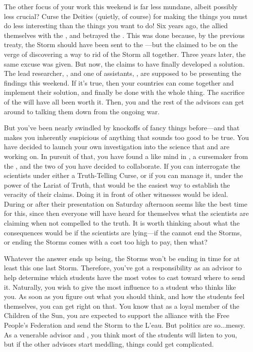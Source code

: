 \documentclass[char]{GL2020}
\begin{document}
The other focus of your work this weekend is far less mundane, albeit possibly less crucial? Curse the Deities (quietly, of course) for making the things you must do less interesting than the things you want to do! Six years ago, the \pFarm{} allied themselves with the \pTech{}, and betrayed the \pShip{}. This was done because, by the previous treaty, the Storm should have been sent to the \pTech{}---but the \pTech{} claimed to be on the verge of discovering a way to rid \pEarth{} of the Storm all together. Three years later, the same excuse was given. But now, the \pTech{} claims to have finally developed a solution. The lead researcher, \cHeadScientist{\full}, and one of \cHeadScientist{\their} assistants, \cAssistantScientist{\full}, are supposed to be presenting the findings this weekend. If it's true, then your countries can come together and implement their solution, and finally be done with the whole thing. The sacrifice of the \pShip{} will have all been worth it. Then, you and the rest of the advisors can get around to talking them down from the ongoing war.

But you've been nearly swindled by knockoffs of fancy things before---and that makes you inherently suspicious of anything that sounds too good to be true. You have decided to launch your own investigation into the science that \cHeadScientist{} and \cAssistantScientist{} are working on. In pursuit of that, you have found a like mind in \cCurse{\full}, a cursemaker from the \pFarm{}, and the two of you have decided to collaborate. If you can interrogate the scientists under either a Truth-Telling Curse, or if you can manage it, under the power of the Lariat of Truth, that would be the easiest way to establish the veracity of their claims. Doing it in front of other witnesses would be ideal. During or after their presentation on Saturday afternoon seems like the best time for this, since then everyone will have heard for themselves what the scientists are claiming when not compelled to the truth. It is worth thinking about what the consequences would be if the scientists are lying---if the \pTech{} cannot end the Storms, or ending the Storms comes with a cost too high to pay, then what? 

Whatever the answer ends up being, the Storms won't be ending in time for at least this one last Storm. Therefore, you've got a responsibility as an advisor to help determine which students have the most votes to cast toward where to send it. Naturally, you wish to give the most influence to a student who thinks like you. As soon as you figure out what you should think, and how the students feel themselves, you can get right on that. You know that as a loyal member of the Children of the Sun, you are expected to support the alliance with the Free People's Federation and send the Storm to the L'eau. But politics are so...messy. As a venerable advisor and \cHedonist{\cleric}, you think most of the students will listen to you, but if the other advisors start meddling, things could get complicated. 
\end{document}
